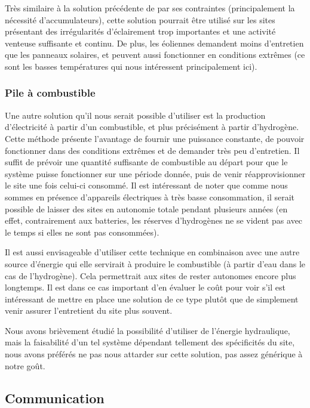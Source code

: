 Très similaire à la solution précédente de par ses contraintes (principalement la nécessité d’accumulateurs), cette solution pourrait être utilisé sur les sites présentant des irrégularités d’éclairement trop importantes et une activité venteuse suffisante et continu. De plus, les éoliennes demandent moins d’entretien que les panneaux solaires, et peuvent aussi fonctionner en conditions extrêmes (ce sont les basses températures qui nous intéressent principalement ici).

\subsubsection{Pile à combustible}

Une autre solution qu’il nous serait possible d’utiliser est la production d’électricité à partir d’un combustible, et plus précisément à partir d’hydrogène. Cette méthode présente l’avantage de fournir une puissance constante, de pouvoir fonctionner dans des conditions extrêmes et de demander très peu d’entretien. Il suffit de prévoir une quantité suffisante de combustible au départ pour que le système puisse fonctionner sur une période donnée, puis de venir réapprovisionner le site une fois celui-ci consommé. Il est intéressant de noter que comme nous sommes en présence d’appareils électriques à très basse consommation, il serait possible de laisser des sites en autonomie totale pendant plusieurs années (en effet, contrairement aux batteries, les réserves d’hydrogènes ne se vident pas avec le temps si elles ne sont pas consommées).

Il est aussi envisageable d’utiliser cette technique en combinaison avec une autre source d’énergie qui elle servirait à produire le combustible (à partir d’eau dans le cas de l’hydrogène). Cela permettrait aux sites de rester autonomes encore plus longtemps. Il est dans ce cas important d’en évaluer le coût pour voir s’il est intéressant de mettre en place une solution de ce type plutôt que de simplement venir assurer l’entretient du site plus souvent.

Nous avons brièvement étudié la possibilité d’utiliser de l’énergie hydraulique, mais la faisabilité d’un tel système dépendant tellement des spécificités du site, nous avons préférés ne pas nous attarder sur cette solution, pas assez générique à notre goût.

\subsection{Communication}


